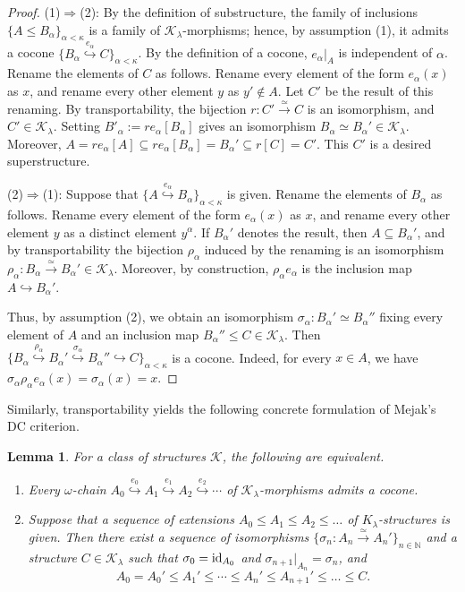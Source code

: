 \documentclass[10pt]{amsart}
\numberwithin{equation}{section}
\theoremstyle{plain}
\newtheorem{lemma}[theorem]{Lemma}
\theoremstyle{definition}
\newcommand{\N}{\mathbb{N}}
\newcommand{\om}{\omega}
\newcommand{\K}{\mathcal{K}}
\newcommand{\embed}{\hookrightarrow}
\newcommand{\edge}[1]{\overset{#1}{\longrightarrow}}
\newcommand{\embedge}[1]{\overset{#1}{\embed}}
\begin{document}
\begin{proof}
(1)$\Rightarrow$(2):
By the definition of substructure, the family of inclusions $\{A\leq B_\alpha\}_{\alpha<\kappa}$ is a family of $\K_\lambda$-morphisms; hence, by assumption (1), it admits a cocone $\{B_\alpha\embedge{e_\alpha}C\}_{\alpha<\kappa}$.
By the definition of a cocone, $e_\alpha|_A$ is independent of $\alpha$.
Rename the elements of $C$ as follows.
Rename every element of the form $e_\alpha(x)$ as $x$, and rename every other element $y$ as $y'\not\in A$.
Let $C'$ be the result of this renaming. By transportability, the bijection $r\colon C'\edge{\simeq}C$ is an isomorphism, and $C'\in\K_\lambda$.
Setting $B'_\alpha:=r e_\alpha[B_\alpha]$ gives an isomorphism $B_\alpha\simeq B_\alpha'\in\K_\lambda$.
Moreover, $A=re_\alpha[A]\subseteq re_\alpha[B_\alpha]=B_\alpha'\subseteq r[C]=C'$.
This $C'$ is a desired superstructure.

(2)$\Rightarrow$(1):
Suppose that $\{A\embedge{e_\alpha}B_\alpha\}_{\alpha<\kappa}$ is given.
Rename the elements of $B_\alpha$ as follows.
Rename every element of the form $e_\alpha(x)$ as $x$, and rename every other element $y$ as a distinct element $y^\alpha$.
If $B_\alpha'$ denotes the result, then $A\subseteq B_\alpha'$, and by transportability the bijection $\rho_\alpha$ induced by the renaming is an isomorphism $\rho_\alpha\colon B_\alpha\edge{\simeq} B_\alpha'\in\K_\lambda$.
Moreover, by construction, $\rho_\alpha e_\alpha$ is the inclusion map $A\embed B_\alpha'$.

Thus, by assumption (2), we obtain an isomorphism $\sigma_\alpha\colon B_\alpha'\simeq B_\alpha''$ fixing every element of $A$ and an inclusion map $B_\alpha''\leq C\in\K_\lambda$.
Then $\{B_\alpha\embedge{\rho_\alpha}B_\alpha'\embedge{\sigma_\alpha}B_\alpha''\embed C\}_{\alpha<\kappa}$ is a cocone.
Indeed, for every $x\in A$, we have $\sigma_\alpha\rho_\alpha e_\alpha(x)=\sigma_\alpha(x)=x$.
\end{proof}

Similarly, transportability yields the following concrete formulation of Mejak's DC criterion.
\begin{lemma}\label{lem:Mejak-DC-criterion}
For a class of structures $\K$, the following are equivalent.
\begin{enumerate}
\item Every $\om$-chain $A_0\embedge{e_0}A_1\embedge{e_1}A_2\embedge{e_2}\cdots$ of $\K_\lambda$-morphisms admits a cocone.
\item Suppose that a sequence of extensions $A_0\leq A_1\leq A_2\leq\dots$ of $K_\lambda$-structures is given.
Then there exist a sequence of isomorphisms $\{\sigma_n\colon A_{n}\edge{\simeq}A_{n}'\}_{n\in\N}$ and a structure $C\in\K_\lambda$ such that $\sigma_0={\rm id}_{A_0}$ and $\sigma_{n+1}|_{A_n}=\sigma_n$, and
\[A_0=A_0'\leq A_1'\leq \cdots\leq A_n'\leq A_{n+1}'\leq \dots\leq C.\]
\end{enumerate}
\end{lemma}
\end{document}
